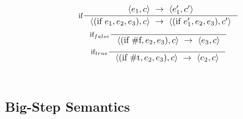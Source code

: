 \documentclass[11pt]{report}
\begin{document}
\begin{gather*}
\inference[if]{\langle e_1, c \rangle~\rightarrow~\langle e_1', c' \rangle}{\langle (\text{if}\ e_1, e_2, e_3), c \rangle~\rightarrow~\langle (\text{if}\ e_1', e_2, e_3), c' \rangle}\\
%
\inference[$\text{if}_{false}$]{}{\langle (\text{if}\ \text{\#f}, e_2, e_3), c \rangle~\rightarrow ~\langle e_3, c \rangle}\\
%
\inference[$\text{if}_{true}$]{}{\langle (\text{if}\ \text{\#t}, e_2, e_3), c \rangle~\rightarrow~\langle e_2, c \rangle}
\end{gather*}\\

\subsection{Big-Step Semantics}
\end{document}

